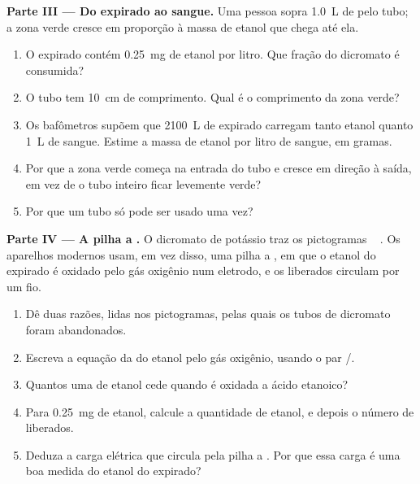 \begin{problem}
\medskip
\noindent\textbf{Parte III --- Do  expirado ao sangue.}
Uma pessoa sopra \qty{1.0}{L} de  pelo tubo; a zona verde cresce em
proporção à massa de etanol que chega até ela.
\begin{enumerate}[resume]
  \item O  expirado contém \qty{0.25}{mg} de etanol por litro. Que
        fração do dicromato é consumida?
  \item O tubo tem \qty{10}{cm} de comprimento. Qual é o comprimento da
        zona verde?
  \item Os bafômetros supõem que \qty{2100}{L} de  expirado carregam
        tanto etanol quanto \qty{1}{L} de sangue. Estime a massa de
        etanol por litro de sangue, em gramas.
  \item Por que a zona verde começa na entrada do tubo e cresce em
        direção à saída, em vez de o tubo inteiro ficar levemente verde?
  \item Por que um tubo só pode ser usado uma vez?
\end{enumerate}

\medskip
\noindent\textbf{Parte IV --- A pilha a .}
O dicromato de potássio traz os pictogramas
\,\,\,\,\,.
Os aparelhos modernos usam, em vez disso, uma pilha a , em
que o etanol do  expirado é oxidado pelo gás oxigênio num eletrodo, e
os  liberados circulam por um fio.
\begin{enumerate}[resume]
  \item Dê duas razões, lidas nos pictogramas, pelas quais os tubos de
        dicromato foram abandonados.
  \item Escreva a equação da  do etanol pelo gás oxigênio, usando
        o par /.
  \item Quantos  uma  de etanol cede quando é oxidada a
        ácido etanoico?
  \item Para \qty{0.25}{mg} de etanol, calcule a quantidade de etanol, e
        depois o número de  liberados.
  \item Deduza a carga elétrica que circula pela pilha a .
        Por que essa carga é uma boa medida do etanol do  expirado?
\end{enumerate}
\end{problem}
